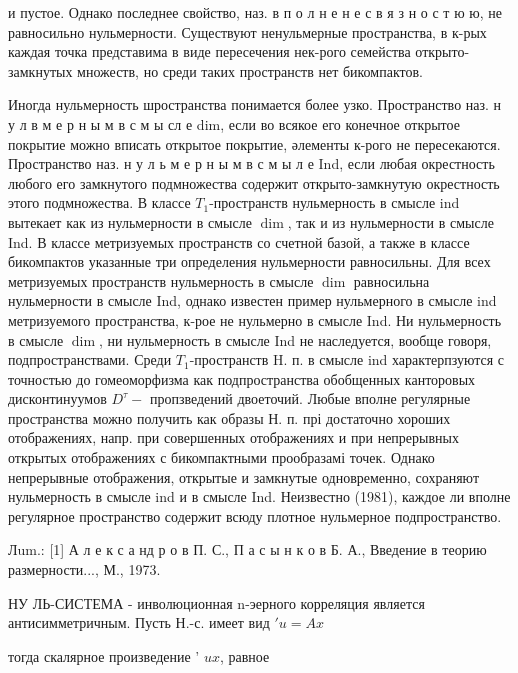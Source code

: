 \documentclass[10pt]{article}
\begin{document}
и пустое. Однако последнее свойство, наз. в п о л н е н е с в я з н о с т ю ю, не равносильно нульмерности. Существуют ненульмерные пространства, в к-рых каждая точка представима в виде пересечения нек-рого семейства открыто-замкнутых множеств, но среди таких пространств нет бикомпактов.



Иногда нульмерность шространства понимается более узко. Пространство наз. н у л в м е р н ы м в с м ы сл е dim, если во всякое его конечное открытое покрытие можно вписать открытое покрытие, әлементы к-рого не пересекаются. Пространство наз. н у л ь м е р н ы м в с м ы л е Ind, если любая окрестность любого его замкнутого подмножества содержит открыто-замкнутую окрестность этого подмножества. В классе $T_{1}$-пространств нульмерность в смысле ind вытекает как из нульмерности в смысле $\operatorname{dim}$, так и из нульмерности в смысле Ind. В классе метризуемых пространств со счетной базой, а также в классе бикомпактов указанные три определения нульмерности равносильны. Для всех метризуемых пространств нульмерность в смысле $\operatorname{dim}$ равносильна нульмерности в смысле Ind, однако известен пример нульмерного в смысле ind метризуемого пространства, к-рое не нульмерно в смысле Ind. Ни нульмерность в смысле $\operatorname{dim}$, ни нульмерность в смысле Ind не наследуется, вообще говоря, подпространствами. Среди $T_{1}$-пространств H. п. в смысле ind характерпзуются с точностью до гомеоморфизма как подпространства обобщенных канторовых дисконтинуумов $D^{\tau}-$ пропзведений двоеточий. Любые вполне регулярные пространства можно получить как образы Н. п. прі достаточно хороших отображениях, напр. при совершенных отображениях и при непрерывных открытых отображениях с бикомпактными прообразамі точек. Однако непрерывные отображения, открытые и замкнутые одновременно, сохраняют нульмерность в смысле ind и в смысле Ind. Неизвестно (1981), каждое ли вполне регулярное пространство содержит всюду плотное нульмерное подпространство.



Лum.: [1] А л е к с а нд р о в П. С., П а с ы н к о в Б. А., Введение в теорию размерности..., М., 1973.



НУ ЛЬ-СИСТЕМА - инволюционная n-эерного корреляция является антисимметричным. Пусть Н.-с. имеет вид $' u=A x$



тогда скалярное произведение ' $u x$, равное
\end{document}
